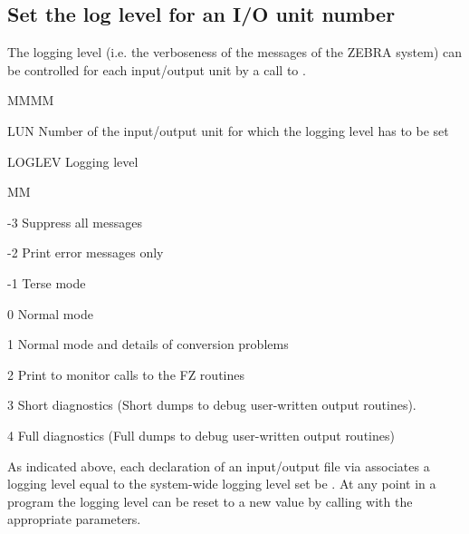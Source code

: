 \subsection{Set the log level for an I/O unit number}
The logging level
(i.e. the verboseness of the messages of the ZEBRA system) can be
controlled for each input/output unit by a call to .
\Idesc
\begin{DL}{MMMM}
\item[LUN]Number of the input/output unit
for which the logging level has to be set
\item[LOGLEV]Logging level
\begin{DL}{MM}
\item[-3]Suppress all messages
\item[-2]Print error messages only
\item[-1]Terse mode
\item[ 0]Normal mode
\item[ 1]Normal mode and details of conversion problems
\item[ 2]Print to monitor calls to the FZ routines
\item[ 3]Short diagnostics
(Short dumps to debug user-written output routines).
\item[ 4]Full diagnostics
(Full dumps to debug user-written output routines)
\end{DL}
\end{DL}
\par
As indicated above, each declaration of an input/output file via
associates a logging level equal to the system-wide logging level
set be .
At any point in a program the logging level can be reset to a new
value by calling  with the appropriate parameters.
